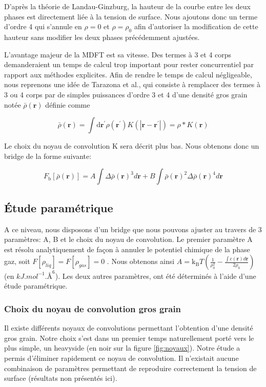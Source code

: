 D'après la théorie de Landau-Ginzburg\cite{Ginzburg2009}, la hauteur de la courbe entre les deux phases est directement liée à la tension de surface. Nous ajoutons donc un terme d'ordre 4 qui s'annule en $\rho=0$ et $\rho=\rho_0$ afin d'autoriser la modification de cette hauteur sans modifier les deux phases précédemment ajustées.

L'avantage majeur de la MDFT est sa vitesse. Des termes à 3 et 4 corps demanderaient un temps de calcul trop important pour rester concurrentiel par rapport aux méthodes explicites. Afin de rendre le temps de calcul négligeable, nous reprenons une idée de Tarazona et al.\cite{tarazona_free-energy_1985}, qui consiste à remplacer des termes à 3 ou 4 corps par de simples puissances d'ordre 3 et 4 d'une densité gros grain notée $\bar{\rho}(\boldsymbol{r})$ définie comme

\begin{equation} \label{eq:convolution_gros_grain}
\bar{\rho}(\boldsymbol{r}) = \int \mathrm{d}\boldsymbol{r}^\prime \rho(\boldsymbol{r}^\prime) K\left(\left|\boldsymbol{r}-\boldsymbol{r}^\prime\right|\right) = \rho\ast K \left(\boldsymbol{r} \right)
\end{equation}

Le choix du noyau de convolution K sera décrit plus bas. Nous obtenons donc un bridge de la forme suivante:

\begin{equation} \label{eq:fbridge_2}
F_{\mathrm{b}}[\bar{\rho}(\boldsymbol{r})]=A\int\Delta\bar{\rho}(\boldsymbol{r})^3d\boldsymbol{r}+B\int\bar{\rho}(\boldsymbol{r})^2\Delta\bar{\rho}(\boldsymbol{r})^4d\boldsymbol{r}
\end{equation} 


\subsection{\'Etude paramétrique}
A ce niveau, nous disposons d'un bridge que nous pouvons ajuster au travers de 3 paramètres: A, B et le choix du noyau de convolution. Le premier paramètre A est résolu analytiquement de façon à annuler le potentiel chimique de la phase gaz, soit $F[\rho_{liq}]=F[\rho_{gas}]=0$ . Nous obtenons ainsi $A=\mathrm{k_B}T(\frac{1}{\rho_0^2} - \frac{\int c(\boldsymbol{r}) d\boldsymbol{r}}{2\rho_0})$ (en $kJ.mol^{-1}.\text{\AA}^{6}$). Les deux autres paramètres, ont été déterminés à l'aide d'une étude paramétrique.

\subsubsection{Choix du noyau de convolution gros grain}
Il existe différents noyaux de convolutions permettant l'obtention d'une densité gros grain. Notre choix s'est dans un premier temps naturellement porté vers le plus simple, un heavyside (en noir sur la figure \ref{fig:noyaux}). Notre étude a permis d'éliminer rapidement ce noyau de convolution. Il n'existait aucune combinaison de paramètres permettant de reproduire correctement la tension de surface (résultats non présentés ici). 










